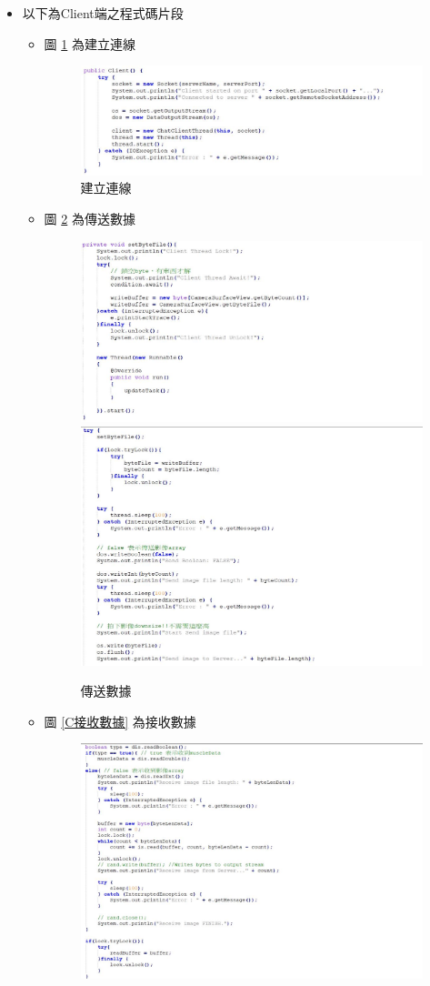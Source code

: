 \documentclass[12pt]{article}  %
\theoremstyle{plain}
\begin{document}
\begin{itemize}
\item 以下為Client端之程式碼片段
\begin{itemize}
\item 圖 \ref{C建立連線} 為建立連線
\begin{figure}[htbp]
\centering
\includegraphics[width=10cm]{pic/ch2/code-Client.JPG}
\caption{建立連線} \label{C建立連線}
\end{figure}
\item 圖 \ref{C傳送數據} 為傳送數據
\begin{figure}[htbp]
\centering
\includegraphics[width=10cm]{pic/ch2/code-Client2.JPG} \\ 
\includegraphics[width=10cm]{pic/ch2/code-Client3.JPG}
\caption{傳送數據} \label{C傳送數據}
\end{figure}
\item 圖 \ref{C接收數據} 為接收數據
\begin{figure}[htbp]
\centering
\includegraphics[width=10cm]{pic/ch2/code-Client4.JPG}

\end{figure}
\end{itemize}
\end{itemize}
\end{document}
